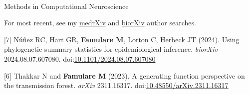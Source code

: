 \documentclass{article}
\begin{document}
\begin{llist}
  

  \\
Methods in Computational Neuroscience 









  \vspace{4pt}

\begin{items}
	
\item[{}] For most recent, see my \href{https://www.medrxiv.org/search/author1%3AM%2BFamulare%20jcode%3Amedrxiv%20numresults%3A75%20sort%3Apublication-date%20direction%3Adescending%20format_result%3Astandard}{medrXiv} and \href{https://www.biorxiv.org/search/author1%3AM%2BFamulare%20jcode%3Abiorxiv%20numresults%3A75%20sort%3Apublication-date%20direction%3Adescending%20format_result%3Astandard}{biorXiv} author searches. 

\item[{[7]}] N\'{u}\~{n}ez RC, Hart GR, \textbf{Famulare M}, Lorton C, Herbeck JT (2024). Using phylogenetic summary statistics for epidemiological inference. \emph{biorXiv} 2024.08.07.607080. doi:\href{https://doi.org/10.1101/2024.08.07.607080}{10.1101/2024.08.07.607080}

\item[{[6]}] Thakkar N and \textbf{Famulare M} (2023). A generating function perspective on the transmission forest. \emph{arXiv} 2311.16317. doi:\href{https://doi.org/10.48550/arXiv.2311.16317}{10.48550/arXiv.2311.16317}


\end{items}
\end{llist}
\end{document}
